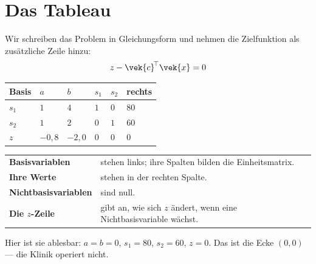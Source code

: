 \section{Das Tableau}

\begin{merksatz}
Wir schreiben das Problem in Gleichungsform und nehmen die Zielfunktion als zusätzliche Zeile hinzu:
\[ z - \vek{c}^{\!\top}\vek{x} = 0 \]

\begin{center}
{\small
\renewcommand{\arraystretch}{1.5}
\begin{tabular}{@{}P{1.6cm}P{1.4cm}P{1.4cm}P{1.4cm}P{1.4cm}P{1.4cm}@{}}
\toprule
\textbf{Basis} & $a$ & $b$ & $s_1$ & $s_2$ & \textbf{rechts}\\
\midrule
$s_1$ & $1$ & $4$ & $1$ & $0$ & $80$\\
$s_2$ & $1$ & $2$ & $0$ & $1$ & $60$\\
\midrule
$z$ & $-0{,}8$ & $-2{,}0$ & $0$ & $0$ & $0$\\
\bottomrule
\end{tabular}}
\end{center}

\begin{center}
\renewcommand{\arraystretch}{1.5}
\begin{tabular}{@{}P{3.2cm}P{5.4cm}@{}}
\toprule
\textbf{Basisvariablen} & stehen links; ihre Spalten bilden die Einheitsmatrix.\\
\textbf{Ihre Werte} & stehen in der rechten Spalte.\\
\textbf{Nichtbasis\-variablen} & sind null.\\
\textbf{Die $z$-Zeile} & gibt an, wie sich $z$ ändert, wenn eine Nichtbasisvariable wächst.\\
\bottomrule
\end{tabular}
\end{center}

Hier ist sie ablesbar: $a = b = 0$, $s_1 = 80$, $s_2 = 60$, $z = 0$. Das ist die Ecke $(0,0)$ --- die Klinik operiert nicht.

\begin{center}
\begin{minipage}{0.88\textwidth}
\end{minipage}
\end{center}
\end{merksatz}

